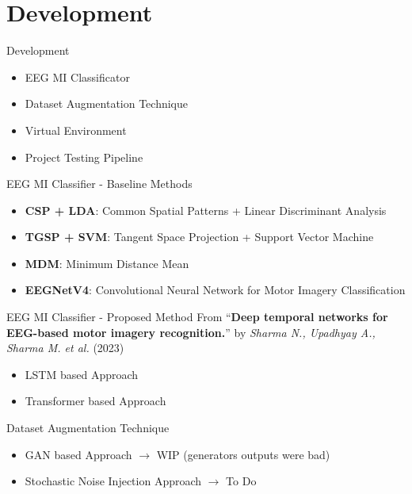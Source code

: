 \section{Development}
\begin{frame}{Development}
\begin{itemize}
    \item EEG MI Classificator
    \item Dataset Augmentation Technique
    \item Virtual Environment
    \item Project Testing Pipeline
\end{itemize}
\end{frame}

\begin{frame}{EEG MI Classifier - Baseline Methods}
\begin{itemize}
    \item \textbf{CSP + LDA}: Common Spatial Patterns + Linear Discriminant Analysis
    \item \textbf{TGSP + SVM}: Tangent Space Projection + Support Vector Machine
    \item \textbf{MDM}: Minimum Distance Mean
    \item \textbf{EEGNetV4}: Convolutional Neural Network for Motor Imagery Classification
\end{itemize}
\end{frame}

\begin{frame}{EEG MI Classifier - Proposed Method}
    From ``\textbf{Deep temporal networks for EEG-based motor imagery recognition.}'' by \textit{Sharma N., Upadhyay A., Sharma M. et al.} (2023)
    \begin{itemize}
        \item LSTM based Approach
        \item Transformer based Approach
    \end{itemize}
\end{frame}

\begin{frame}{Dataset Augmentation Technique}
    \begin{itemize}
        \item GAN based Approach $\rightarrow{}$ WIP (generators outputs were bad)
        \item Stochastic Noise Injection Approach $\rightarrow{}$ To Do
    \end{itemize}
\end{frame}

